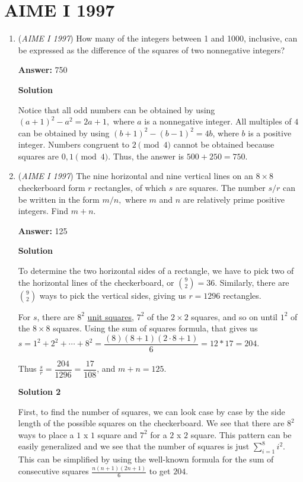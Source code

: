 \section{AIME I 1997}
        \begin{enumerate}
        	\item (\textit{AIME I 1997}) How many of the integers between 1 and 1000, inclusive, can be expressed as the difference of the squares of two nonnegative integers?


 
 \textbf{Answer: }750



\textbf{Solution}

Notice that all odd numbers can be obtained by using $(a+1)^2-a^2=2a+1,$ where $a$ is a nonnegative integer. All multiples of $4$ can be obtained by using $(b+1)^2-(b-1)^2 = 4b$, where $b$ is a positive integer. Numbers congruent to $2 \pmod 4$ cannot be obtained because squares are $0, 1 \pmod 4.$ Thus, the answer is $500+250 = \boxed{750}.$



	\item (\textit{AIME I 1997}) The nine horizontal and nine vertical lines on an $8\times8$ checkerboard form $r$ rectangles, of which $s$ are squares.  The number $s/r$ can be written in the form $m/n,$ where $m$ and $n$ are relatively prime positive integers.  Find $m + n.$

 \textbf{Answer: }125



\textbf{Solution}

To determine the two horizontal sides of a rectangle, we have to pick two of the horizontal lines of the checkerboard, or ${9\choose 2} = 36$. Similarly, there are ${9\choose 2}$ ways to pick the vertical sides, giving us $r = 1296$ rectangles.

 For $s$, there are $8^2$ \href{https://artofproblemsolving.com/wiki/index.php?title=Unit\_square}{unit squares}, $7^2$ of the $2\times2$ squares, and so on until $1^2$ of the $8\times 8$ squares. Using the sum of squares formula, that gives us $s=1^2+2^2+\cdots+8^2=\dfrac{(8)(8+1)(2\cdot8+1)}{6}=12*17=204$.

 Thus $\frac sr = \dfrac{204}{1296}=\dfrac{17}{108}$, and $m+n=\boxed{125}$.

 



\textbf{Solution 2}

First, to find the number of squares, we can look case by case by the side length of the possible squares on the checkerboard. We see that there are $8^2$ ways to place a $1$ x $1$ square and $7^2$ for a $2$ x $2$ square. This pattern can be easily generalized and we see that the number of squares is just $\sum^8_{i=1}{i^2}$. This can be simplified by using the well-known formula for the sum of consecutive squares $\frac{n(n+1)(2n+1)}{6}$ to get $204$.


\end{enumerate}
